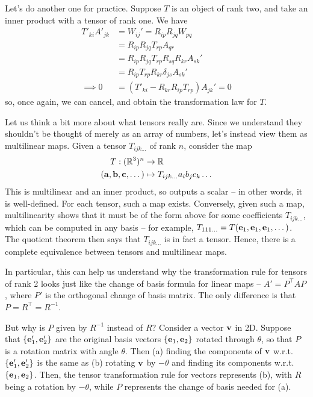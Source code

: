 \documentclass{../../template/note}
\begin{document}
    Let's do another one for practice. Suppose \(T\) is an object of rank two, and take an inner product with a tensor of rank one. We have
    \begin{align*}
        T'_{ki}A'_{jk} &= W_{ij}' = R_{ip}R_{jq}W_{pq} \\
        &= R_{ip}R_{jq}T_{rp}A_{qr} \\
        &= R_{ip}R_{jq}T_{rp}R_{sq}R_{kr}A_{sk}' \\
        &= R_{ip}T_{rp}R_{kr}\delta_{js}A_{sk}' \\
        \implies 0 &= (T'_{ki}-R_{kr}R_{ip}T_{rp})A_{jk}' = 0
    \end{align*}
    so, once again, we can cancel, and obtain the transformation law for \(T\).
    
    \begin{remark*}
        Let us think a bit more about what tensors really are. Since we understand they shouldn't be thought of merely as an array of numbers, let's instead view them as multilinear maps. Given a tensor \(T_{ijk\dots}\) of rank \(n\), consider the map
        \begin{align*}
            T: (\RR^3)^n &\to \RR \\
            (\V a, \V b, \V c, \dots) &\mapsto T_{ijk\dots} a_i b_j c_k \dots
        \end{align*}
        This is multilinear and an inner product, so outputs a scalar -- in other words, it is well-defined. For each tensor, such a map exists. Conversely, given such a map, multilinearity shows that it must be of the form above for some coefficients \(T_{ijk\dots}\), which can be computed in any basis -- for example, \(T_{111\dots} = T(\V e_1, \V e_1, \V e_1, \dots)\). The quotient theorem then says that \(T_{ijk\dots}\) is in fact a tensor. Hence, there is a complete equivalence between tensors and multilinear maps.

        In particular, this can help us understand why the transformation rule for tensors of rank 2 looks just like the change of basis formula for linear maps -- \(A' = P^\intercal AP\), where \(P'\) is the orthogonal change of basis matrix. The only difference is that \(P = R^\intercal = R^{-1}\).

        But why is \(P\) given by \(R^{-1}\) instead of \(R\)? Consider a vector \(\V v\) in 2D. Suppose that \(\{\V e_1', \V e_2'\}\) are the original basis vectors \(\{\V e_1, \V e_2\}\) rotated through \(\theta\), so that \(P\) is a rotation matrix with angle \(\theta\). Then (a) finding the components of \(\V v\) w.r.t. \(\{\V e_1', \V e_2'\}\) is the same as (b) rotating \(\V v\) by \(-\theta\) and finding its components w.r.t. \(\{\V e_1, \V e_2\}\). Then, the tensor transformation rule for vectors represents (b), with \(R\) being a rotation by \(-\theta\), while \(P\) represents the change of basis needed for (a).
    \end{remark*}
    
\end{document}
